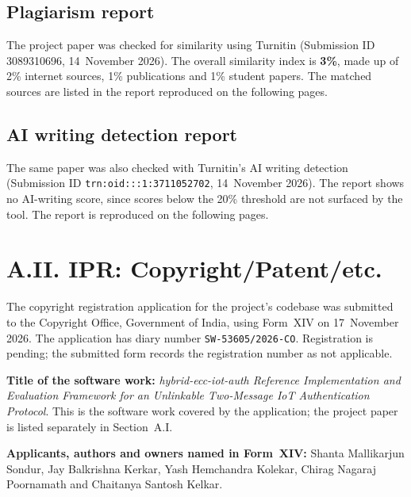 \subsection*{Plagiarism report}
The project paper was checked for similarity using Turnitin (Submission ID 3089310696, 14~November 2026). The overall similarity index is \textbf{3\%}, made up of 2\% internet sources, 1\% publications and 1\% student papers. The matched sources are listed in the report reproduced on the following pages.



\subsection*{AI writing detection report}
The same paper was also checked with Turnitin's AI writing detection (Submission ID \texttt{trn:oid:::1:3711052702}, 14~November 2026). The report shows no AI-writing score, since scores below the 20\% threshold are not surfaced by the tool. The report is reproduced on the following pages.



\section*{A.II. IPR: Copyright/Patent/etc.}
The copyright registration application for the project's codebase was submitted to the Copyright Office, Government of India, using Form~XIV on 17~November 2026. The application has diary number \texttt{SW-53605/2026-CO}. Registration is pending; the submitted form records the registration number as not applicable.

\textbf{Title of the software work:} \emph{hybrid-ecc-iot-auth Reference Implementation and Evaluation Framework for an Unlinkable Two-Message IoT Authentication Protocol}. This is the software work covered by the application; the project paper is listed separately in Section~A.I.

\textbf{Applicants, authors and owners named in Form~XIV:} Shanta Mallikarjun Sondur, Jay Balkrishna Kerkar, Yash Hemchandra Kolekar, Chirag Nagaraj Poornamath and Chaitanya Santosh Kelkar.


